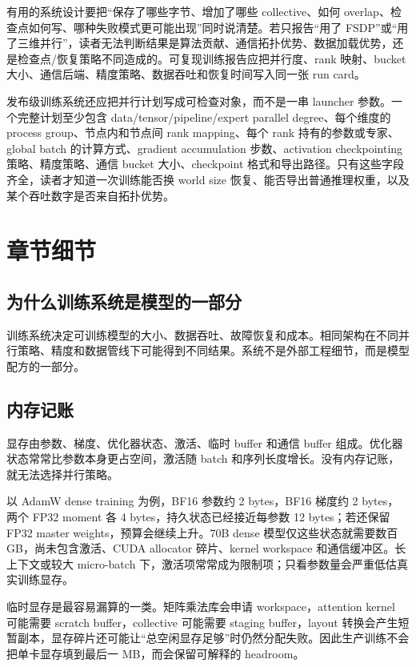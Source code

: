 \documentclass[UTF8,zihao=-4,openany]{ctexbook}
\begin{document}
有用的系统设计要把“保存了哪些字节、增加了哪些 collective、如何 overlap、检查点如何写、哪种失败模式更可能出现”同时说清楚。若只报告“用了 FSDP”或“用了三维并行”，读者无法判断结果是算法贡献、通信拓扑优势、数据加载优势，还是检查点/恢复策略不同造成的。可复现训练报告应把并行度、rank 映射、bucket 大小、通信后端、精度策略、数据吞吐和恢复时间写入同一张 run card。

发布级训练系统还应把并行计划写成可检查对象，而不是一串 launcher 参数。一个完整计划至少包含 data/tensor/pipeline/expert parallel degree、每个维度的 process group、节点内和节点间 rank mapping、每个 rank 持有的参数或专家、global batch 的计算方式、gradient accumulation 步数、activation checkpointing 策略、精度策略、通信 bucket 大小、checkpoint 格式和导出路径。只有这些字段齐全，读者才知道一次训练能否换 world size 恢复、能否导出普通推理权重，以及某个吞吐数字是否来自拓扑优势。

\section{章节细节}
\subsection{为什么训练系统是模型的一部分}
训练系统决定可训练模型的大小、数据吞吐、故障恢复和成本。相同架构在不同并行策略、精度和数据管线下可能得到不同结果。系统不是外部工程细节，而是模型配方的一部分。

\subsection{内存记账}
显存由参数、梯度、优化器状态、激活、临时 buffer 和通信 buffer 组成。优化器状态常常比参数本身更占空间，激活随 batch 和序列长度增长。没有内存记账，就无法选择并行策略。

以 AdamW dense training 为例，BF16 参数约 2 bytes，BF16 梯度约 2 bytes，两个 FP32 moment 各 4 bytes，持久状态已经接近每参数 12 bytes；若还保留 FP32 master weights，预算会继续上升。70B dense 模型仅这些状态就需要数百 GB，尚未包含激活、CUDA allocator 碎片、kernel workspace 和通信缓冲区。长上下文或较大 micro-batch 下，激活项常常成为限制项；只看参数量会严重低估真实训练显存。

临时显存是最容易漏算的一类。矩阵乘法库会申请 workspace，attention kernel 可能需要 scratch buffer，collective 可能需要 staging buffer，layout 转换会产生短暂副本，显存碎片还可能让“总空闲显存足够”时仍然分配失败。因此生产训练不会把单卡显存填到最后一 MB，而会保留可解释的 headroom。
\end{document}

